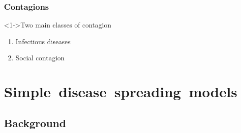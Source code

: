 \begin{frame}
  \frametitle{Contagions}
  
  \begin{block}<1->{Two main classes of contagion}
    \begin{enumerate}
    \item<2-> \alert{Infectious diseases}
      \medskip
    \item<3-> \alert{Social contagion}
    \end{enumerate}
  \end{block}

\end{frame}




\section{Simple\ disease\ spreading\ models}

\subsection{Background}

%
%
%







